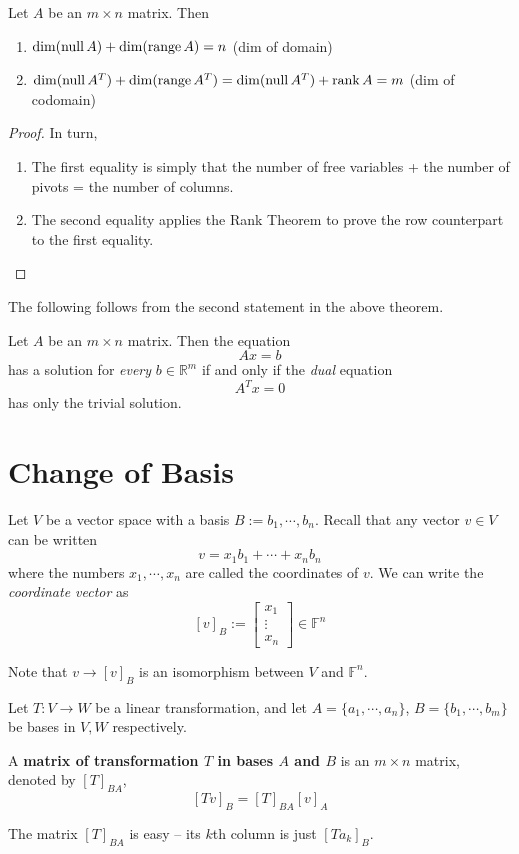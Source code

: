\begin{theorem}
Let $A$ be an $m \times n$ matrix. Then 
\begin{enumerate}
	\item $\operatorname{dim}(\operatorname{null} A) + \operatorname{dim}(\operatorname{range} A) = n$ (dim of domain)
	\item $\operatorname{dim}(\operatorname{null} A^{T}) + \operatorname{dim}(\operatorname{range} A^{T}) = \operatorname{dim}(\operatorname{null} A^{T}) + \operatorname{rank} A = m$ (dim of codomain)
\end{enumerate}
\end{theorem}

\begin{proof}
In turn, 
\begin{enumerate}
	\item The first equality is simply that the number of free variables + the number of pivots = the number of columns. 
	\item The second equality applies the Rank Theorem to prove the row counterpart to the first equality. 
\end{enumerate}
\end{proof}

The following follows from the second statement in the above theorem. 
\begin{theorem}
Let $A$ be an $m \times n$ matrix. Then the equation 
$$Ax = b$$ 
has a solution for \textit{every} $b \in \mathbb{R}^{m}$ if and only if the \textit{dual} equation 
$$A^{T}x = 0$$ 
has only the trivial solution. 
\end{theorem}

\section{Change of Basis}
Let $V$ be a vector space with a basis $B := b_{1}, \cdots, b_{n}$. Recall that any vector $v \in V$ can be written
$$v = x_{1} b_{1} + \cdots + x_{n} b_{n}$$
where the numbers $x_{1}, \cdots, x_{n}$ are called the coordinates of $v$. We can write the \textit{coordinate vector} as 
$$[v]_{B} := \begin{bmatrix}
x_{1} \\
\vdots \\
x_{n}
\end{bmatrix} \in \mathbb{F}^{n}$$

Note that $v \rightarrow [v]_{B}$ is an isomorphism between $V$ and $\mathbb{F}^{n}$.

\begin{definition}
Let $T: V \rightarrow W$ be a linear transformation, and let $A = \{a_{1}, \cdots, a_{n}\}$, $B = \{ b_{1}, \cdots, b_{m} \}$ be bases in $V,W$ respectively. 

A \textbf{matrix of transformation $T$ in bases $A$ and $B$} is an $m \times n$ matrix, denoted by $[T]_{BA}$, 
$$[Tv]_{B} = [T]_{BA} [v]_{A}$$

The matrix $[T]_{BA}$ is easy -- its $k$th column is just $[Ta_{k}]_{B}$. 
\end{definition}

